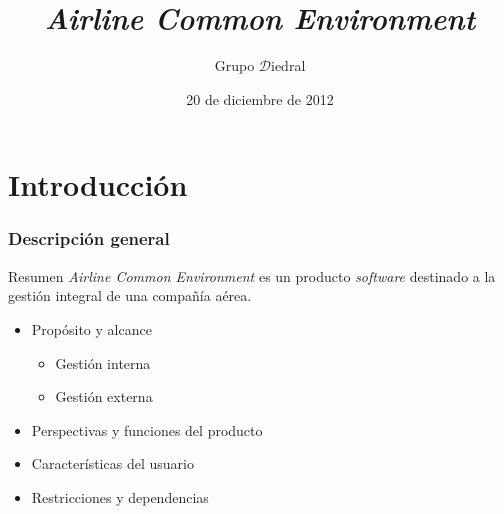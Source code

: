 \documentclass{beamer}
\institute{Universidad Complutense de Madrid}
\title[ACE]{\itshape Airline Common Environment}
\author{Grupo $\mathcal{D}$iedral}
\date{20 de diciembre de 2012}
\newcommand{\software}{\textit{software }}
\begin{document}
\maketitle

	
	\section{Introducción}
	
\begin{frame}
	\frametitle{Descripción general}
	
	\begin{block}{Resumen}
		\textit{Airline Common Environment} es un producto \software destinado a la gestión integral de una compañía aérea.		\end{block}

	\begin{itemize}
		\item Propósito y alcance
			\begin{itemize}
				\item Gestión interna
				\item Gestión externa
			\end{itemize}
		\item Perspectivas y funciones del producto
		\item Características del usuario
		\item Restricciones y dependencias
	\end{itemize}
\end{frame}
\end{document}
